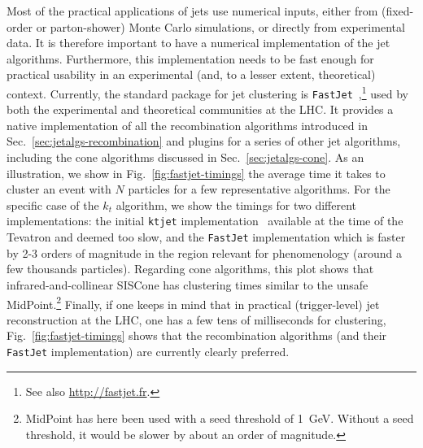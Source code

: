 Most of the practical applications of jets use numerical inputs,
either from (fixed-order or parton-shower) Monte Carlo simulations, or
directly from experimental data. It is therefore important to have a
numerical implementation of the jet algorithms.
%
Furthermore, this implementation needs to be fast enough for practical
usability in an experimental (and, to a lesser extent, theoretical)
context.
%
Currently, the standard package for jet clustering is
{\tt{FastJet}}~\cite{Cacciari:2005hq,Cacciari:2011ma},\footnote{See
  also \url{http://fastjet.fr}.} used by both the experimental and
theoretical communities at the LHC. It provides a native
implementation of all the recombination algorithms introduced in
Sec.~\ref{sec:jetalgs-recombination} and plugins for a series of
other jet algorithms, including the cone algorithms discussed in
Sec.~\ref{sec:jetalgs-cone}.
%
As an illustration, we show in Fig.~\ref{fig:fastjet-timings} the
average time it takes to cluster an event with $N$ particles for a few
representative algorithms.
%
For the specific case of the $k_t$ algorithm, we show the timings for
two different implementations: the initial {\tt{ktjet}}
implementation~\cite{Butterworth:2002xg} available at the time of the
Tevatron and deemed too slow, and the {\tt{FastJet}} implementation
which is faster by 2-3 orders of magnitude in the region relevant for
phenomenology (around a few thousands particles).
%
Regarding cone algorithms, this plot shows that
infrared-and-collinear SISCone has clustering times similar to the
unsafe MidPoint.\footnote{MidPoint has here been used with a seed
  threshold of 1~GeV. Without a seed threshold, it would be slower by
  about an order of magnitude.}
%
Finally, if one keeps in mind that in practical (trigger-level) jet
reconstruction at the LHC, one has a few tens of milliseconds for
clustering, Fig.~\ref{fig:fastjet-timings} shows that the
recombination algorithms (and their {\tt{FastJet}} implementation) are
currently clearly preferred.

